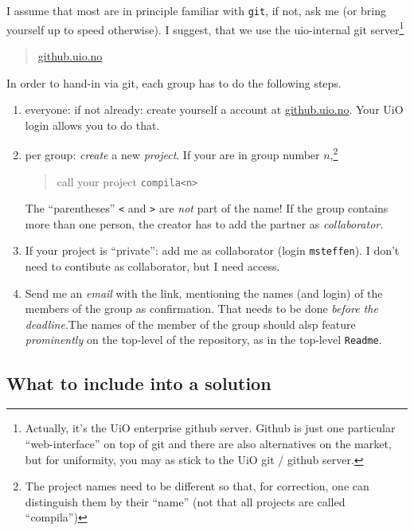 \documentclass[10pt,freeform]{handout}[2014/08/13]
\begin{document}
I assume that most are in principle familiar with \texttt{git}, if not, ask
me (or bring yourself up to speed otherwise).  I suggest, that we use the
uio-internal git server\footnote{Actually, it's the UiO enterprise github
  server. Github is just one particular ``web-interface'' on top of git and
  there are also alternatives on the market, but for uniformity, you may as
  stick to the UiO git / github server.}

\begin{quote}
  \url{github.uio.no}
\end{quote}


In order to hand-in via git, each group has to do the following steps.

\begin{enumerate}
\item everyone: if not already: create yourself a account at
  \url{github.uio.no}. Your UiO login allows you to do that.
\item per group: \emph{create} a new \emph{project}.  If your are in group
  number $n$,\footnote{The project names need to be different so that, for
    correction, one can distinguish them by their ``name'' (not that all
    projects are called ``compila'')}
  \begin{quote}
    call your project \texttt{compila<n>}
  \end{quote}
  The ``parentheses'' \texttt{<} and \texttt{>} are \emph{not} part of the
  name! If the group contains more than one person, the creator has to add
  the partner as \emph{collaborator.} 
\item If your project is ``private'': add me as collaborator (login
  \texttt{msteffen}). I don't need to contibute as collaborator, but I need
  access.
\item Send me an \emph{email} with the link, mentioning the names (and
  login) of the members of the group as confirmation. That needs to be done
  \emph{before the deadline}.The names of the member of the group should
  alsp feature \emph{prominently} on the top-level of the repository, as in
  the top-level \texttt{Readme}.
\end{enumerate}


\subsection{What to include into a solution}
\label{sec:what-include-into}
\end{document}
